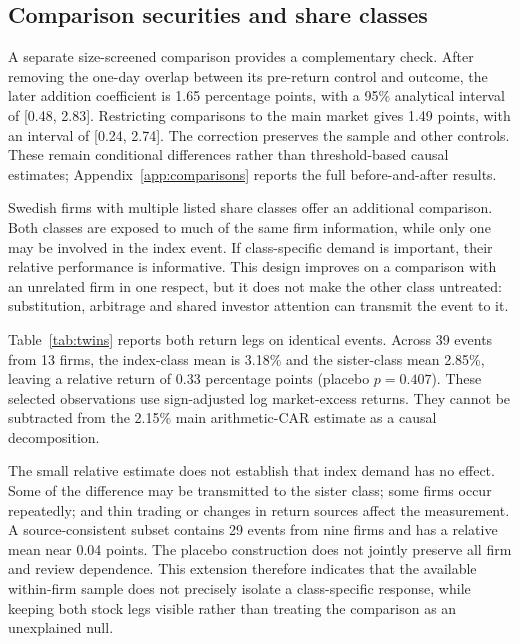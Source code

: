 \subsection{Comparison securities and share classes}

A separate size-screened comparison provides a complementary check. After removing the one-day overlap between its pre-return control and outcome, the later addition coefficient is 1.65 percentage points, with a 95\% analytical interval of [0.48, 2.83]. Restricting comparisons to the main market gives 1.49 points, with an interval of [0.24, 2.74]. The correction preserves the sample and other controls. These remain conditional differences rather than threshold-based causal estimates; Appendix~\ref{app:comparisons} reports the full before-and-after results.

Swedish firms with multiple listed share classes offer an additional comparison. Both classes are exposed to much of the same firm information, while only one may be involved in the index event. If class-specific demand is important, their relative performance is informative. This design improves on a comparison with an unrelated firm in one respect, but it does not make the other class untreated: substitution, arbitrage and shared investor attention can transmit the event to it.



Table~\ref{tab:twins} reports both return legs on identical events. Across 39 events from 13 firms, the index-class mean is 3.18\% and the sister-class mean 2.85\%, leaving a relative return of 0.33 percentage points (placebo $p=0.407$). These selected observations use sign-adjusted log market-excess returns. They cannot be subtracted from the 2.15\% main arithmetic-CAR estimate as a causal decomposition.

The small relative estimate does not establish that index demand has no effect. Some of the difference may be transmitted to the sister class; some firms occur repeatedly; and thin trading or changes in return sources affect the measurement. A source-consistent subset contains 29 events from nine firms and has a relative mean near 0.04 points. The placebo construction does not jointly preserve all firm and review dependence. This extension therefore indicates that the available within-firm sample does not precisely isolate a class-specific response, while keeping both stock legs visible rather than treating the comparison as an unexplained null.




\FloatBarrier

